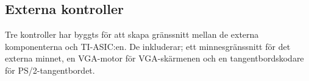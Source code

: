 \documentclass[main.tex]{subfiles}
\begin{document}
\subsection{Externa kontroller}
Tre kontroller har byggts för att skapa gränssnitt mellan de externa
komponenterna och TI-ASIC:en. De inkluderar; ett minnesgränssnitt för det
externa minnet, en VGA-motor för VGA-skärmenen och en tangentbordskodare för
PS/2-tangentbordet.




\end{document}

